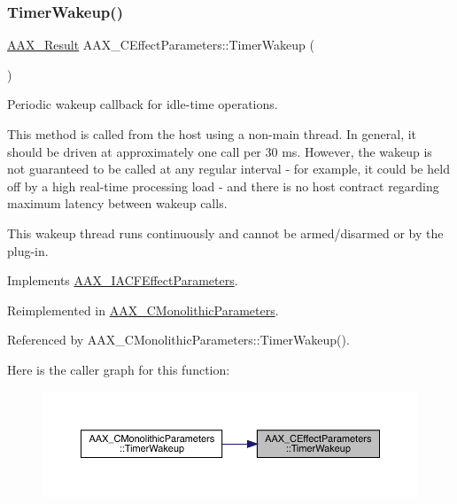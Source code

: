 \subsubsection{\texorpdfstring{TimerWakeup()}{TimerWakeup()}}
{\footnotesize\ttfamily \mbox{\hyperlink{a00392_a4d8f69a697df7f70c3a8e9b8ee130d2f}{A\+A\+X\+\_\+\+Result}} A\+A\+X\+\_\+\+C\+Effect\+Parameters\+::\+Timer\+Wakeup (\begin{DoxyParamCaption}{ }\end{DoxyParamCaption})\hspace{0.3cm}{\ttfamily [virtual]}}



Periodic wakeup callback for idle-\/time operations. 

This method is called from the host using a non-\/main thread. In general, it should be driven at approximately one call per 30 ms. However, the wakeup is not guaranteed to be called at any regular interval -\/ for example, it could be held off by a high real-\/time processing load -\/ and there is no host contract regarding maximum latency between wakeup calls.

This wakeup thread runs continuously and cannot be armed/disarmed or by the plug-\/in. 

Implements \mbox{\hyperlink{a01669_ab5b8da9e1a9d778d327ac04f4ab8d139}{A\+A\+X\+\_\+\+I\+A\+C\+F\+Effect\+Parameters}}.



Reimplemented in \mbox{\hyperlink{a01969_ac3f92841efe2d864ffefce94b7ae27b4}{A\+A\+X\+\_\+\+C\+Monolithic\+Parameters}}.



Referenced by A\+A\+X\+\_\+\+C\+Monolithic\+Parameters\+::\+Timer\+Wakeup().

Here is the caller graph for this function\+:
\nopagebreak
\begin{figure}[H]
\begin{center}
\leavevmode
\includegraphics[width=350pt]{a01481_a4e1dc0e4b966fe80041d67814d13e03d_icgraph}
\end{center}
\end{figure}
\mbox{\label{a01481_a258910d59fee409213caa04e51ee68cf}} 
